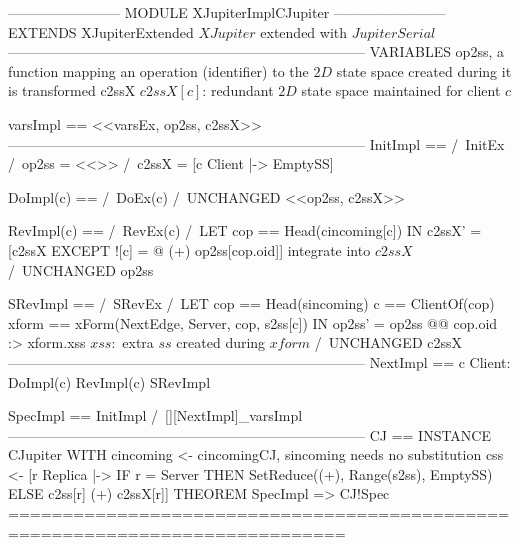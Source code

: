 \documentclass{article}
\begin{document}
\begin{tla}
------------------------ MODULE XJupiterImplCJupiter ------------------------
EXTENDS XJupiterExtended \* $XJupiter$ extended with $JupiterSerial$
-----------------------------------------------------------------------------
VARIABLES op2ss,  \* a function mapping an operation (identifier)
                  \* to the $2D$ state space created during it is transformed
          c2ssX   \* $c2ssX[c]$: redundant $2D$ state space maintained for client $c$

varsImpl == <<varsEx, op2ss, c2ssX>>
-----------------------------------------------------------------------------
InitImpl ==
    /\ InitEx
    /\ op2ss = <<>>
    /\ c2ssX = [c \in Client |-> EmptySS]

DoImpl(c) ==
    /\ DoEx(c)
    /\ UNCHANGED <<op2ss, c2ssX>>

RevImpl(c) ==
    /\ RevEx(c)
    /\ LET cop == Head(cincoming[c])
       IN  c2ssX' = [c2ssX EXCEPT ![c] = @ (+) op2ss[cop.oid]] \* integrate into $c2ssX$
    /\ UNCHANGED op2ss

SRevImpl == 
    /\ SRevEx
    /\ LET cop == Head(sincoming)
             c == ClientOf(cop)
         xform == xForm(NextEdge, Server, cop, s2ss[c])  
       IN op2ss' = op2ss @@ cop.oid :> xform.xss \* $xss:$ extra $ss$ created during $xform$
    /\ UNCHANGED c2ssX
-----------------------------------------------------------------------------
NextImpl ==
    \/ \E c \in Client: DoImpl(c) \/ RevImpl(c)
    \/ SRevImpl
    
SpecImpl == InitImpl /\ [][NextImpl]_varsImpl
-----------------------------------------------------------------------------
CJ == INSTANCE CJupiter 
        WITH cincoming <- cincomingCJ, \* sincoming needs no substitution
             css <- [r \in Replica |-> IF r = Server 
                                       THEN SetReduce((+), Range(s2ss), EmptySS)
                                       ELSE c2ss[r] (+) c2ssX[r]]
THEOREM SpecImpl => CJ!Spec
=============================================================================
\end{tla}
\end{document}
